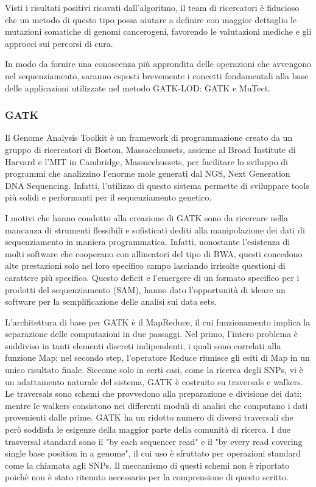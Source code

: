 Visti i risultati positivi ricavati dall'algoritmo, il team di ricercatori è fiducioso che un metodo di questo tipo possa aiutare a definire con maggior dettaglio le mutazioni somatiche di genomi cancerogeni, favorendo le valutazioni mediche e gli approcci sui percorsi di cura.

In modo da fornire una conoscenza più approndita delle operazioni che avvengono nel sequenziamento, saranno esposti brevemente i concetti fondamentali alla base delle applicazioni utilizzate nel metodo GATK-LOD: GATK e MuTect.

\subsubsection{GATK}
Il Genome Analysis Toolkit è un framework di programmazione creato da un gruppo di ricercatori di Boston, Massacchussets, assieme al Broad Institute di Harvard e l'MIT in Cambridge, Massacchussets, per facilitare lo sviluppo di programmi che analizzino l'enorme mole generati dal NGS, Next Generation DNA Sequencing.
Infatti, l'utilizzo di questo sistema permette di sviluppare tools più solidi e performanti per il sequenziamento genetico.

I motivi che hanno condotto alla creazione di GATK sono da ricercare nella mancanza di strumenti flessibili e sofisticati dediti alla manipolazione dei dati di sequenziamento in maniera programmatica.
Infatti, nonostante l'esistenza di molti software che cooperano con allineatori del tipo di BWA, questi concedono alte prestazioni solo nel loro specifico campo lasciando irrisolte questioni di carattere più specifico.
Questo deficit e l'emergere di un formato specifico per i prodotti del sequenziamento (SAM), hanno dato l'opportunità di ideare un software per la semplificazione delle analisi sui data sets.

L'architettura di base per GATK è il MapReduce, il cui funzionamento implica la separazione delle computazioni in due passaggi.
Nel primo, l'intero problema è suddiviso in tanti elementi discreti indipendenti, i quali sono correlati alla funzione Map; nel secondo step, l'operatore Reduce riunisce gli esiti di Map in un unico risultato finale.
Siccome solo in certi casi, come la ricerca degli SNPs, vi è un adattamento naturale del sistema, GATK è costruito su traversals e walkers.
Le traversals sono schemi che provvedono alla preparazione e divisione dei dati; mentre le walkers consistono nei differenti moduli di analisi che computano i dati provenienti dalle prime.
GATK ha un ridotto numero di diversi traversali che però soddisfa le esigenze della maggior parte della comunità di ricerca.
I due trasversal standard sono il "by each sequencer read" e il "by every read covering single base position in a genome", il cui uso è sfruttato per operazioni standard come la chiamata agli SNPs.
Il meccanismo di questi schemi non è riportato poichè non è stato ritenuto necessario per la comprensione di questo scritto.

